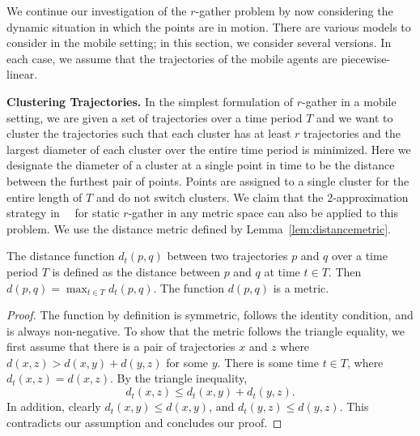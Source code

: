 We continue our investigation of the $r$-gather problem by now considering the dynamic situation in which the points are in motion. There are various models to consider in the mobile setting; in this section, we consider several versions.  In each case, we assume that the trajectories of the mobile agents are piecewise-linear.

\medskip\noindent\textbf{Clustering Trajectories.} In the simplest formulation of $r$-gather in a mobile setting, we are given a set of trajectories over a time period $T$ and we want to cluster the trajectories such that each cluster has at least $r$ trajectories and the largest diameter of each cluster over the entire time period is minimized.  Here we designate the diameter of a cluster at a single point in time to be the distance between the furthest pair of points.  Points are assigned to a single cluster for the entire length of $T$ and do not switch clusters.  We claim that the $2$-approximation strategy in~~\cite{Aggarwal06achievinganonymity} for static $r$-gather in any metric space can also be applied to this problem.  
We use the distance metric defined by Lemma~\ref{lem:distancemetric}.  

\begin{lemma}\label{lem:distancemetric}
The distance function $d_t(p,q)$ between two trajectories $p$ and $q$ over a time period $T$ is defined as the distance between $p$ and $q$ at time $t \in T$.  Then $d(p,q) = \max_{t \in T}d_t(p,q)$.  The function $d(p,q)$ is a metric.
\end{lemma}
\begin{proof}
The function by definition is symmetric, follows the identity condition, and is always non-negative.  To show that the metric follows the triangle equality, we first assume that there is a pair of trajectories $x$ and $z$ where $d(x,z) > d(x,y) + d(y,z)$ for some $y$.  There is some time $t \in T$, where $d_t(x,z) = d(x,z)$.  By the triangle inequality,
$$d_t(x,z) \leq d_t(x,y) + d_t(y,z).$$
In addition, clearly $d_t(x, y) \leq d(x, y)$, and $d_t(y, z)\leq d(y, z)$. 
This contradicts our assumption and concludes our proof.
\end{proof}





